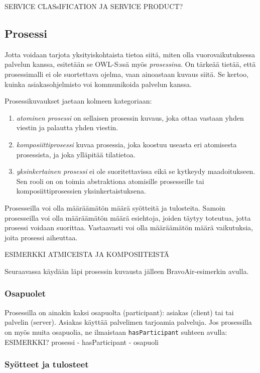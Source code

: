 \documentclass[finnish]{tktltiki2}
\theoremstyle{definition}
\theoremstyle{remark}
\begin{document}
SERVICE CLASsIFICATION JA SERVICE PRODUCT?

\subsection{Prosessi}

Jotta voidaan tarjota yksityiskohtaista tietoa siitä, miten olla vuorovaikutuksessa palvelun kanssa, esitetään se OWL-S:ssä myös \textit{prosessina}. On tärkeää tietää, että prosessimalli ei ole suortettava ojelma, vaan ainoastaan kuvaus siitä\cite{OWLS}. Se kertoo, kuinka asiakasohjelmisto voi kommunikoida palvelun kanssa. 

Prosessikuvaukset jaetaan kolmeen kategoriaan\cite{OWLS}:
\begin{enumerate}
\item \textit{atominen prosessi} on sellaisen prosessin kuvaus, joka ottaa vastaan yhden viestin ja palautta yhden viestin. 
\item \textit{komposiittiprosessi} kuvaa prosessia, joka koostuu useasta eri atomisesta prosessista, ja joka ylläpitää tilatietoa. 
\item \textit{yksinkertainen prosessi} ei ole suoritettavissa eikä se kytkeydy maadoitukseen. Sen rooli on on toimia abstraktiona atomisille prosesseille tai komposiittiprosessien yksinkertaistuksena. 
\end{enumerate}

Prosesseilla voi olla määräämätön määrä syötteitä ja tulosteita. Samoin prosesseilla voi olla määräämätön määrä esiehtoja, joiden täytyy toteutua, jotta prosessi voidaan suorittaa. Vastaavasti voi olla määräämätön määrä vaikutuksia, joita prosessi aiheuttaa\cite{OWLS}.

ESIMERKKI ATMICEISTA JA KOMPOSIITEISTÄ

Seuraavassa käydään läpi prosessin kuvausta jälleen BravoAir-esimerkin\cite{daml} avulla.

\subsubsection{Osapuolet}

Prosessilla on ainakin kaksi osapuolta (participant): asiakas (client) tai tai palvelin (server). Asiakas käyttää palvelimen tarjoamia palveluja\cite{OWLS}.
Jos prosessilla on myös muita osapuolia, ne ilmaistaan \texttt{hasParticipant} suhteen avulla:
ESIMERKKI? prosessi - hasParticipant - osapuoli

\subsubsection{Syötteet ja tulosteet}
\end{document}
